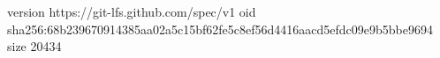 version https://git-lfs.github.com/spec/v1
oid sha256:68b239670914385aa02a5c15bf62fe5c8ef56d4416aacd5efdc09e9b5bbe9694
size 20434
